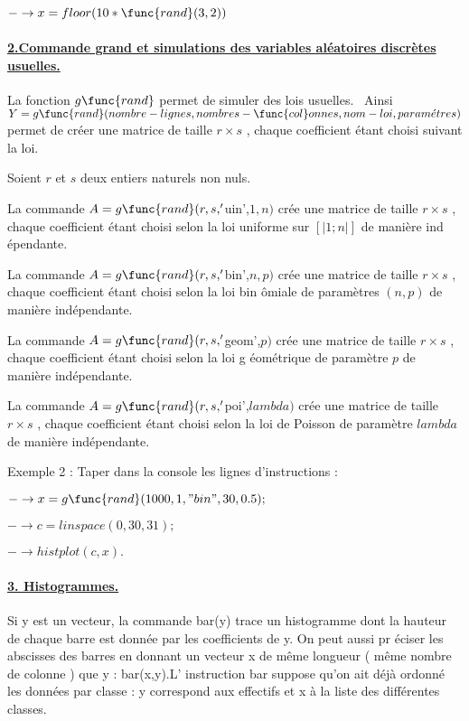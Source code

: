 \documentclass{article}
\begin{document}
$-\rightarrow x=floor(10\ast \func{rand}(3,2))$

\paragraph{\protect\underline{2.Commande grand et simulations des variables
al\'{e}atoires discr\`{e}tes usuelles.}}

La fonction $g\func{rand}$ permet de simuler des lois usuelles. \ Ainsi $Y=g%
\func{rand}(nombre-lignes,nombres-\func{col}onnes,nom-loi,param\acute{e}%
tres) $ permet de cr\'{e}er une matrice de taille $r\times s$ , chaque
coefficient \'{e}tant choisi suivant la loi.

Soient $r$ et $s$ deux entiers naturels non nuls.

La commande $A=g\func{rand}(r,s,^{\prime }$uin',$1,n)$ cr\'{e}e une matrice
de taille $r\times s$ , chaque coefficient \'{e}tant choisi selon la loi
uniforme sur $\left[ \left\vert 1;n\right\vert \right] $ de mani\`{e}re ind%
\'{e}pendante.

La commande $A=g\func{rand}(r,s,^{\prime }$bin',$n,p)$ cr\'{e}e une matrice
de taille $r\times s$ , chaque coefficient \'{e}tant choisi selon la loi bin%
\^{o}miale de param\`{e}tres $(n,p)$ de mani\`{e}re ind\'{e}pendante.

La commande $A=g\func{rand}(r,s,^{\prime }$geom',$p)$ cr\'{e}e une matrice
de taille $r\times s$ , chaque coefficient \'{e}tant choisi selon la loi g%
\'{e}om\'{e}trique de param\`{e}tre $p$ de mani\`{e}re ind\'{e}pendante.

La commande $A=g\func{rand}(r,s,^{\prime }$poi',$lambda)$ cr\'{e}e une
matrice de taille $r\times s$ , chaque coefficient \'{e}tant choisi selon la
loi de Poisson de param\`{e}tre $lambda$ de mani\`{e}re ind\'{e}pendante.

Exemple 2 : Taper dans la console les lignes d'instructions :

$-\rightarrow x=g\func{rand}(1000,1,"bin",30,0.5);$

$-\rightarrow c=linspace(0,30,31);$

$-\rightarrow histplot(c,x).$

\paragraph{\protect\underline{3. Histogrammes.}}

Si y est un vecteur, la commande bar(y) trace un histogramme dont la hauteur
de chaque barre est donn\'{e}e par les coefficients de y. On peut aussi pr%
\'{e}ciser les abscisses des barres en donnant un vecteur x de m\^{e}me
longueur ( m\^{e}me nombre de colonne ) que y : bar(x,y).L' instruction bar
suppose qu'on ait d\'{e}j\`{a} ordonn\'{e} les donn\'{e}es par classe : y
correspond aux effectifs et x \`{a} la liste des diff\'{e}rentes classes.
\end{document}
